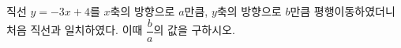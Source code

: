 직선 $y=-3x+4$를 $x$축의 방향으로 $a$만큼, $y$축의 방향으로 $b$만큼 평행이동하였더니 처음 직선과 일치하였다. 이때 $\dfrac{b}{a}$의 값을 구하시오. 
